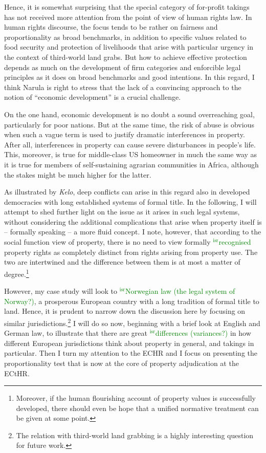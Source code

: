 \documentclass[12pt,a4paper]{book} %
\newcommand{\isr}[1]{\textcolor{green}{$^{\textrm{isr}}${#1}}}
\begin{document}
Hence, it is somewhat surprising that the special category of for-profit takings has not received more attention from the point of view of human rights law. In human rights discourse, the focus tends to be rather on fairness and proportionality as broad benchmarks, in addition to specific values related to food security and protection of livelihoods that arise with particular urgency in the context of third-world land grabs. But how to achieve effective protection depends as much on the development of firm categories and enforcible legal principles as it does on broad benchmarks and good intentions. In this regard, I think Narula is right to stress that the lack of a convincing approach to the notion of ``economic development'' is a crucial challenge.

On the one hand, economic development is no doubt a sound overreaching goal, particularly for poor nations. But at the same time, the risk of abuse is obvious when such a vague term is used to justify dramatic interferences in property. After all, interferences in property can cause severe disturbances in people's life. This, moreover, is true for middle-class US homeowner in much the same way as it is true for members of self-sustaining agrarian communities in Africa, although the stakes might be much higher for the latter.

As illustrated by {\it Kelo}, deep conflicts can arise in this regard also in developed democracies with long established systems of formal title. In the following, I will attempt to shed further light on the issue as it arises in such legal systems, without considering the additional complications that arise when property itself is -- formally speaking -- a more fluid concept. I note, however, that according to the social function view of property, there is no need to view formally \isr{recognised} property rights as completely distinct from rights arising from property use. The two are intertwined and the difference between them is at most a matter of degree.\footnote{Moreover, if the human flourishing account of property values is successfully developed, there should even be hope that a unified normative treatment can be given at some point.}

However, my case study will look to \isr{Norwegian law (the legal system of Norway?)}, a prosperous European country with a long tradition of formal title to land. Hence, it is prudent to narrow down the discussion here by focusing on similar jurisdictions.\footnote{The relation with third-world land grabbing is a highly interesting question for future work.} I will do so now, beginning with a brief look at English and German law, to illustrate that there are great \isr{differences (variances?)} in how different European jurisdictions think about property in general, and takings in particular. Then I turn my attention to the ECHR and I focus on presenting the proportionality test that is now at the core of property adjudication at the ECtHR.
\end{document}

